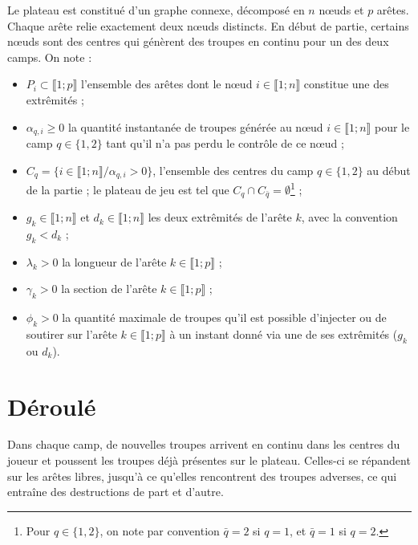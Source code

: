 \documentclass[a4paper,11pt,headings=normal]{scrartcl}
\theoremstyle{mythm}
\begin{document}
Le plateau est constitué d'un graphe connexe, décomposé en $n$ nœuds
et $p$ arêtes. Chaque arête relie exactement deux nœuds distincts. En
début de partie, certains nœuds sont des \og centres \fg{} qui
génèrent des troupes en continu pour un des deux camps. On note :
\begin{itemize}
  \item $P_i \subset \llbracket 1 ; p \rrbracket$ l'ensemble des
    arêtes dont le nœud $i \in \llbracket 1 ; n \rrbracket$ constitue
    une des extrêmités ;

  \item $\alpha_{q,i} \geq 0$ la quantité instantanée de troupes
    générée au nœud $i \in \llbracket 1 ; n \rrbracket$ pour le camp
    $q \in \{1, 2\}$ tant qu'il n'a pas perdu le contrôle de ce nœud ;

  \item $C_q = \{ i \in \llbracket 1 ; n \rrbracket / \alpha_{q,i} > 0
    \}$, l'ensemble des centres du camp $q \in \{1, 2\}$ au début de
    la partie ; le plateau de jeu est tel que $C_q \cap C_{\bar q} =
    \emptyset$\footnote{Pour $q \in \{1, 2\}$, on note par convention
    ${\bar q} = 2$ si $q = 1$, et ${\bar q} = 1$ si $q = 2$.} ;

  \item $g_k \in \llbracket 1 ; n \rrbracket$ et $d_k \in \llbracket 1
    ; n \rrbracket$ les deux extrêmités de l'arête $k$, avec la
    convention $g_k < d_k$ ;

  \item $\lambda_k > 0$ la longueur de l'arête $k \in \llbracket 1 ; p
    \rrbracket$ ;

  \item $\gamma_k > 0$ la section de l'arête $k \in \llbracket 1 ; p
    \rrbracket$ ;

  \item $\phi_k > 0$ la quantité maximale de troupes qu'il est
    possible d'injecter ou de soutirer sur l'arête $k \in \llbracket 1
    ; p \rrbracket$ à un instant donné via une de ses extrêmités
    ($g_k$ ou $d_k$).
\end{itemize}

\section{Déroulé}

Dans chaque camp, de nouvelles troupes arrivent en continu dans les
centres du joueur et poussent les troupes déjà présentes sur le
plateau. Celles-ci se répandent sur les arêtes libres, jusqu'à ce
qu'elles rencontrent des troupes adverses, ce qui entraîne des
destructions de part et d'autre.
\end{document}
